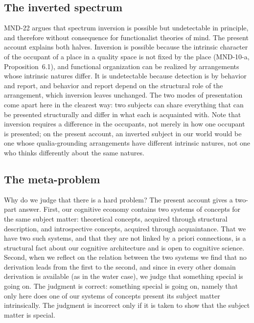 \documentclass{situationist-preprint}
\begin{document}
\subsection{The inverted spectrum}

MND-22 argues that spectrum inversion is possible but undetectable in principle, and therefore without consequence for functionalist theories of mind. The present account explains both halves. Inversion is possible because the intrinsic character of the occupant of a place in a quality space is not fixed by the place (MND-10-a, Proposition~6.1), and functional organization can be realized by arrangements whose intrinsic natures differ. It is undetectable because detection is by behavior and report, and behavior and report depend on the structural role of the arrangement, which inversion leaves unchanged. The two modes of presentation come apart here in the clearest way: two subjects can share everything that can be presented structurally and differ in what each is acquainted with. Note that inversion requires a difference in the occupants, not merely in how one occupant is presented; on the present account, an inverted subject in our world would be one whose qualia-grounding arrangements have different intrinsic natures, not one who thinks differently about the same natures.

\subsection{The meta-problem}

Why do we judge that there is a hard problem? The present account gives a two-part answer. First, our cognitive economy contains two systems of concepts for the same subject matter: theoretical concepts, acquired through structural description, and introspective concepts, acquired through acquaintance. That we have two such systems, and that they are not linked by a priori connections, is a structural fact about our cognitive architecture and is open to cognitive science. Second, when we reflect on the relation between the two systems we find that no derivation leads from the first to the second, and since in every other domain derivation is available (as in the water case), we judge that something special is going on. The judgment is correct: something special is going on, namely that only here does one of our systems of concepts present its subject matter intrinsically. The judgment is incorrect only if it is taken to show that the subject matter is special.
\end{document}
